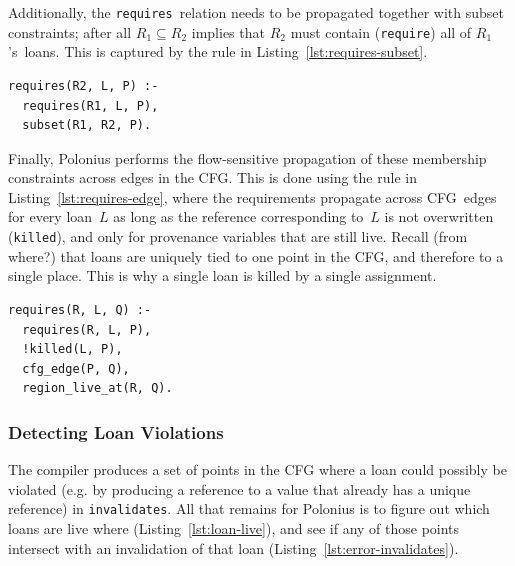 \documentclass[11pt,a4paper,twoside,openany]{report}
\newcommand{\fixme}[1] {{\color{red}#1}}
\newenvironment{sourcecode}{\captionsetup{type=listing}}{}
\newcommand{\InDatalog}[1]{\texttt{#1}}
\begin{document}
Additionally, the \InDatalog{requires}~relation needs to be propagated together
with subset constraints; after all $R_1 \subseteq R_2$ implies that $R_2$ must
contain (\InDatalog{require}) all of $R_1$'s~loans. This is captured by the rule
in Listing~\ref{lst:requires-subset}.

\begin{sourcecode}
  \label{lst:requires-subset}
\begin{verbatim}
requires(R2, L, P) :- 
  requires(R1, L, P), 
  subset(R1, R2, P).
\end{verbatim}
\end{sourcecode}

Finally, Polonius performs the flow-sensitive propagation of these membership
constraints across edges in the CFG. This is done using the rule in
Listing~\ref{lst:requires-edge}, where the requirements propagate across
CFG~edges for every loan~$L$ as long as the reference corresponding to~$L$ is
not overwritten (\InDatalog{killed}), and only for provenance variables that are
still live. Recall \fixme{(from where?)} that loans are uniquely tied to one
point in the CFG, and therefore to a single place. This is why a single loan is
killed by a single assignment.

\begin{sourcecode}
  \label{lst:requires-edge}
\begin{verbatim}
requires(R, L, Q) :-
  requires(R, L, P),
  !killed(L, P),
  cfg_edge(P, Q),
  region_live_at(R, Q).
\end{verbatim}
\end{sourcecode}


\subsubsection{Detecting Loan Violations}

The compiler produces a set of points in the CFG where a loan could possibly be
violated (e.g. by producing a reference to a value that already has a unique
reference) in \InDatalog{invalidates}. All that remains for Polonius is to
figure out which loans are live where (Listing~\ref{lst:loan-live}), and see if
any of those points intersect with an invalidation of that loan
(Listing~\ref{lst:error-invalidates}).
\end{document}
